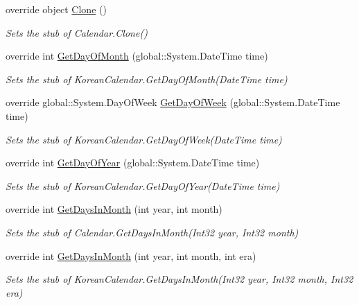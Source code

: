 \begin{DoxyCompactItemize}
override object \hyperlink{class_system_1_1_globalization_1_1_fakes_1_1_stub_korean_calendar_a6339a12b0b46355dcbb20363fedeac7c}{Clone} ()
\begin{DoxyCompactList}\small\item\em Sets the stub of Calendar.\-Clone()\end{DoxyCompactList}\item 
override int \hyperlink{class_system_1_1_globalization_1_1_fakes_1_1_stub_korean_calendar_a51433d295b3715034d72b97f3d804a67}{Get\-Day\-Of\-Month} (global\-::\-System.\-Date\-Time time)
\begin{DoxyCompactList}\small\item\em Sets the stub of Korean\-Calendar.\-Get\-Day\-Of\-Month(\-Date\-Time time)\end{DoxyCompactList}\item 
override global\-::\-System.\-Day\-Of\-Week \hyperlink{class_system_1_1_globalization_1_1_fakes_1_1_stub_korean_calendar_a650a325be2cec1f88d70927c588cd4c1}{Get\-Day\-Of\-Week} (global\-::\-System.\-Date\-Time time)
\begin{DoxyCompactList}\small\item\em Sets the stub of Korean\-Calendar.\-Get\-Day\-Of\-Week(\-Date\-Time time)\end{DoxyCompactList}\item 
override int \hyperlink{class_system_1_1_globalization_1_1_fakes_1_1_stub_korean_calendar_a53c6e3701b07721934e0b6661c6c13cc}{Get\-Day\-Of\-Year} (global\-::\-System.\-Date\-Time time)
\begin{DoxyCompactList}\small\item\em Sets the stub of Korean\-Calendar.\-Get\-Day\-Of\-Year(\-Date\-Time time)\end{DoxyCompactList}\item 
override int \hyperlink{class_system_1_1_globalization_1_1_fakes_1_1_stub_korean_calendar_aa0af82e9b8b83d7f72eff87ec62f3943}{Get\-Days\-In\-Month} (int year, int month)
\begin{DoxyCompactList}\small\item\em Sets the stub of Calendar.\-Get\-Days\-In\-Month(\-Int32 year, Int32 month)\end{DoxyCompactList}\item 
override int \hyperlink{class_system_1_1_globalization_1_1_fakes_1_1_stub_korean_calendar_ac9f6c667753e7ecccbce02b39f1b4d21}{Get\-Days\-In\-Month} (int year, int month, int era)
\begin{DoxyCompactList}\small\item\em Sets the stub of Korean\-Calendar.\-Get\-Days\-In\-Month(\-Int32 year, Int32 month, Int32 era)\end{DoxyCompactList}\item 

\end{DoxyCompactItemize}
